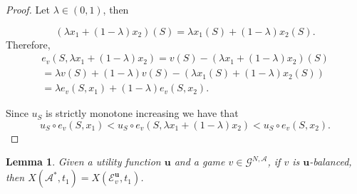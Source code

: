 \documentclass[a4paper,12pt]{article}
\newtheorem{lemma}[theorem]{Lemma}
\theoremstyle{definition}
\theoremstyle{remark}
\begin{document}
\begin{proof}
Let $\lambda \in (0, 1)$, then 

\begin{equation*}
(\lambda x_1 + (1- \lambda) x_2)(S) = \lambda x_1(S) + (1- \lambda)x_2(S).
\end{equation*}
Therefore, 
\begin{equation*}
\begin{split}
e_v(S, \lambda x_1 + (1- \lambda) x_2) = v(S)-(\lambda x_1 + (1- \lambda) x_2)(S) \\
= \lambda v(S) + (1- \lambda) v(S) - (\lambda x_1(S) + (1- \lambda)x_2(S)) \\
= \lambda e_v(S, x_1) + (1- \lambda)e_v(S, x_2).
\end{split}
\end{equation*}

Since $u_S$ is strictly monotone increasing we have that
\begin{equation*}
u_S\circ e_v(S, x_1) < u_S\circ e_v(S, \lambda x_1 + (1-\lambda) x_2) < u_S\circ e_v(S, x_2).
\end{equation*}
\end{proof}

\begin{lemma}\label{lemma:X1=X1'}
Given a utility function $\mathbf{u}$ and a  game $v\in \mathcal{G}^{N, \mathcal{A}}$, if $v$ is $\mathbf{u}$-balanced, then $X(\mathcal{A}^\ast, t_1) = X(\mathcal{E}_v^{\mathbf{u}}, t_1)$.
\end{lemma}
\end{document}
